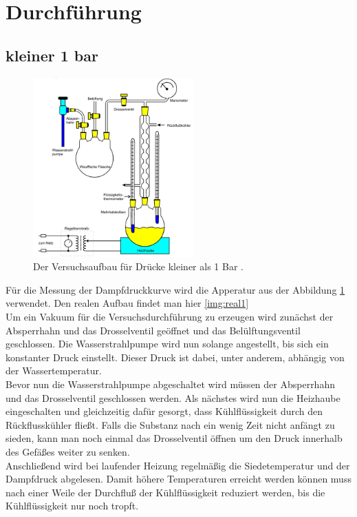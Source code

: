 \section{Durchführung}

\subsection{kleiner 1 bar}
\begin{figure}[H]
    \centering
    \includegraphics[width=0.55\textwidth]{images/Abbildung3.PNG}
    \caption{Der Versuchsaufbau für Drücke kleiner als 1 Bar \protect \cite{V203}.}
    \label{img:aufbau1}
\end{figure}
Für die Messung der Dampfdruckkurve wird die Apperatur aus der Abbildung \ref{img:aufbau1} verwendet. Den realen Aufbau findet man hier \ref{img:real1}  \\
Um ein Vakuum für die Versuchsdurchführung zu erzeugen wird zunächst der Absperrhahn und das Drosselventil geöffnet und das Belülftungsventil geschlossen. 
Die Wasserstrahlpumpe wird nun solange angestellt, bis sich ein konstanter Druck einstellt. 
Dieser Druck ist dabei, unter anderem, abhängig von der Wassertemperatur.\\
Bevor nun die Wasserstrahlpumpe abgeschaltet wird müssen der Absperrhahn und das Drosselventil geschlossen werden. Als nächstes wird nun die Heizhaube 
eingeschalten und gleichzeitig dafür gesorgt, dass Kühlflüssigkeit durch den Rückflusskühler fließt. Falls die Substanz nach ein wenig Zeit 
nicht anfängt zu sieden, kann man noch einmal das Drosselventil öffnen um den Druck innerhalb des Gefäßes weiter zu senken.\\
Anschließend wird bei laufender Heizung regelmäßig die Siedetemperatur und der Dampfdruck abgelesen. Damit höhere Temperaturen erreicht werden können
muss nach einer Weile der Durchfluß der Kühlflüssigkeit reduziert werden, bis die Kühlflüssigkeit nur noch tropft.


